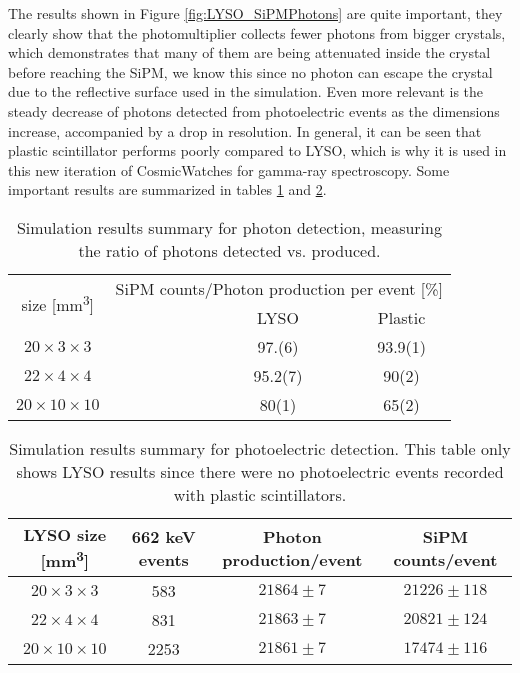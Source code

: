 The results shown in Figure \ref{fig:LYSO_SiPMPhotons} are quite important, they clearly show that the photomultiplier collects fewer photons from bigger crystals, which demonstrates that many of them are being attenuated inside the crystal before reaching the SiPM, we know this since no photon can escape the crystal due to the reflective surface used in the simulation. Even more relevant is the steady decrease of photons detected from photoelectric events as the dimensions increase, accompanied by a drop in resolution. In general, it can be seen that plastic scintillator performs poorly compared to LYSO, which is why it is used in this new iteration of CosmicWatches for gamma-ray spectroscopy. Some important results are summarized in tables \ref{tab:sim_results_detection_percentage} and \ref{tab:sim_results_photoelectric_efficiency}.

\begin{table}[H]
  \caption{Simulation results summary for photon detection, measuring the ratio of photons detected vs. produced.}
  \centering
  \begin{tabular}{ c c c }
    \midrule
    \multirow{2}{*}{size [\unit{\mm\cubed}]} & \multicolumn{2}{c}{SiPM counts/Photon production per event [\%]} \\
    & ~~~~~~~~~~~~LYSO & Plastic \\
    \midrule
    $20\times3\times3$ & ~~~~~~~~~~~~97.(6) & 93.9(1) \\
    $22\times4\times4$ & ~~~~~~~~~~~~95.2(7) & 90(2) \\
    $20\times10\times10$ & ~~~~~~~~~~~~80(1) & 65(2) \\
    \bottomrule
  \end{tabular}
  \label{tab:sim_results_detection_percentage}
\end{table}

\begin{table}[H]
  \caption{Simulation results summary for photoelectric detection. This table only shows LYSO results since there were no photoelectric events recorded with plastic scintillators.}
  \centering
  \begin{tabular}{ c c c c}
    \midrule
    LYSO size [\unit{\mm\cubed}] & 662 \unit{\kilo\eV} events & Photon production/event & SiPM counts/event \\
    \midrule
    $20\times3\times3$ & 583 & $21864\pm 7$ & $21226\pm 118$ \\
    $22\times4\times4$ & 831 & $21863\pm 7$ & $20821\pm 124$ \\
    $20\times10\times10$ & 2253 & $21861\pm 7$ & $17474\pm 116$ \\
    \bottomrule
  \end{tabular}
  \label{tab:sim_results_photoelectric_efficiency}
\end{table}